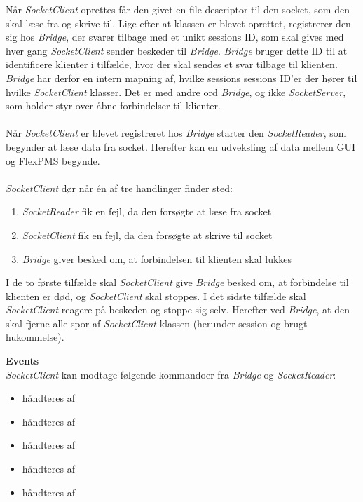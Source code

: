 Når \textit{SocketClient} oprettes får den givet en file-descriptor til den socket, som den skal læse fra og skrive til. Lige efter at klassen er blevet oprettet, registrerer den sig hos \textit{Bridge}, der svarer tilbage med et unikt sessions ID, som skal gives med hver gang \textit{SocketClient} sender beskeder til \textit{Bridge}. \textit{Bridge} bruger dette ID til at identificere klienter i tilfælde, hvor der skal sendes et svar tilbage til klienten. \textit{Bridge} har derfor en intern mapning af, hvilke sessions sessions ID'er der hører til hvilke \textit{SocketClient} klasser. Det er med andre ord \textit{Bridge}, og ikke \textit{SocketServer}, som holder styr over åbne forbindelser til klienter.\\\\

Når \textit{SocketClient} er blevet registreret hos \textit{Bridge} starter den \textit{SocketReader}, som begynder at læse data fra socket. Herefter kan en udveksling af data mellem GUI og FlexPMS begynde.\\\\

\textit{SocketClient} dør når én af tre handlinger finder sted:

\begin{enumerate}
\item \textit{SocketReader} fik en fejl, da den forsøgte at læse fra socket
\item \textit{SocketClient} fik en fejl, da den forsøgte at skrive til socket
\item \textit{Bridge} giver besked om, at forbindelsen til klienten skal lukkes 
\end{enumerate}

I de to første tilfælde skal \textit{SocketClient} give \textit{Bridge} besked om, at forbindelse til klienten er død, og \textit{SocketClient} skal stoppes. I det sidste tilfælde skal \textit{SocketClient} reagere på beskeden og stoppe sig selv. Herefter ved \textit{Bridge}, at den skal fjerne alle spor af \textit{SocketClient} klassen (herunder session og brugt hukommelse).


\textbf{Events}\\

\textit{SocketClient} kan modtage følgende kommandoer fra \textit{Bridge} og \textit{SocketReader}:

\begin{itemize}
\item {} håndteres af 
\item {} håndteres af 
\item {} håndteres af 
\item {} håndteres af 
\item {} håndteres af 
\end{itemize}

